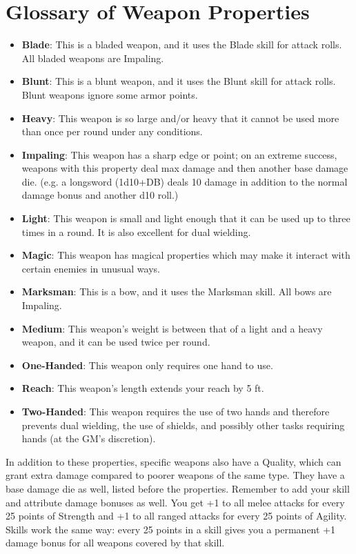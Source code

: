 \section{Glossary of Weapon Properties}
\begin{itemize}
	\item \textbf{Blade}: This is a bladed weapon, and it uses the Blade skill for attack rolls. All bladed weapons are Impaling.
	\item \textbf{Blunt}: This is a blunt weapon, and it uses the Blunt skill for attack rolls. Blunt weapons ignore some armor points.
	\item \textbf{Heavy}: This weapon is so large and/or heavy that it cannot be used more than once per round under any conditions.
	\item \textbf{Impaling}: This weapon has a sharp edge or point; on an extreme success, weapons with this property deal max damage and then another base damage die. (e.g. a longsword (1d10+DB) deals 10 damage in addition to the normal damage bonus and another d10 roll.)
	\item \textbf{Light}: This weapon is small and light enough that it can be used up to three times in a round. It is also excellent for dual wielding.
	\item \textbf{Magic}: This weapon has magical properties which may make it interact with certain enemies in unusual ways.
	\item \textbf{Marksman}: This is a bow, and it uses the Marksman skill. All bows are Impaling.
	\item \textbf{Medium}: This weapon's weight is between that of a light and a heavy weapon, and it can be used twice per round.
	\item \textbf{One-Handed}: This weapon only requires one hand to use.
	\item \textbf{Reach}: This weapon's length extends your reach by 5 ft.
	\item \textbf{Two-Handed}: This weapon requires the use of two hands and therefore prevents dual wielding, the use of shields, and possibly other tasks requiring hands (at the GM's discretion).
\end{itemize}

In addition to these properties, specific weapons also have a Quality, which can grant extra damage compared to poorer weapons of the same type. They have a base damage die as well, listed before the properties. Remember to add your skill and attribute damage bonuses as well. You get +1 to all melee attacks for every 25 points of Strength and +1 to all ranged attacks for every 25 points of Agility. Skills work the same way: every 25 points in a skill gives you a permanent +1 damage bonus for all weapons covered by that skill.\\

